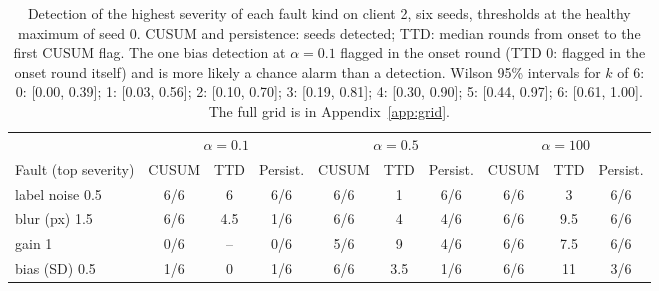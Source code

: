 \begin{table}[t]
\centering
\small
\setlength{\tabcolsep}{4pt}
\begin{tabular}{lccccccccc}
\toprule
 & \multicolumn{3}{c}{$\alpha = 0.1$} & \multicolumn{3}{c}{$\alpha = 0.5$} & \multicolumn{3}{c}{$\alpha = 100$} \\
\cmidrule(lr){2-4}\cmidrule(lr){5-7}\cmidrule(lr){8-10}
Fault (top severity) & CUSUM & TTD & Persist. & CUSUM & TTD & Persist. & CUSUM & TTD & Persist. \\
\midrule
label noise 0.5 & 6/6 & 6 & 6/6 & 6/6 & 1 & 6/6 & 6/6 & 3 & 6/6 \\
blur (px) 1.5 & 6/6 & 4.5 & 1/6 & 6/6 & 4 & 4/6 & 6/6 & 9.5 & 6/6 \\
gain 1 & 0/6 & -- & 0/6 & 5/6 & 9 & 4/6 & 6/6 & 7.5 & 6/6 \\
bias (SD) 0.5 & 1/6 & 0 & 1/6 & 6/6 & 3.5 & 1/6 & 6/6 & 11 & 3/6 \\
\bottomrule
\end{tabular}
\caption{Detection of the highest severity of each fault kind on client 2, six seeds, thresholds at the healthy maximum of seed 0. CUSUM and persistence: seeds detected; TTD: median rounds from onset to the first CUSUM flag. The one bias detection at $\alpha = 0.1$ flagged in the onset round (TTD 0: flagged in the onset round itself) and is more likely a chance alarm than a detection. Wilson 95\% intervals for $k$ of 6: 0: [0.00, 0.39]; 1: [0.03, 0.56]; 2: [0.10, 0.70]; 3: [0.19, 0.81]; 4: [0.30, 0.90]; 5: [0.44, 0.97]; 6: [0.61, 1.00]. The full grid is in Appendix~\ref{app:grid}.}
\label{tab:kinds}
\end{table}
